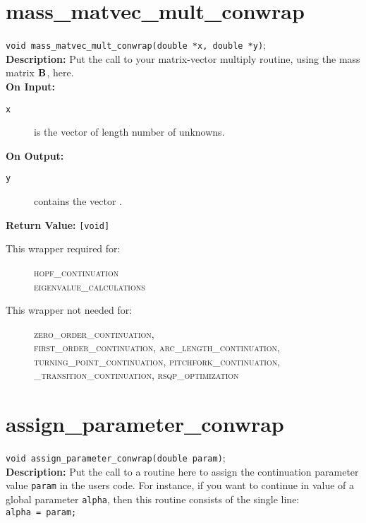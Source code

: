 \section{mass\_matvec\_mult\_conwrap}
\texttt{void mass\_matvec\_mult\_conwrap(double *x, double *y)}; \\

{\bf Description:}  Put the call to your matrix-vector multiply routine, using the mass matrix ${\bf B}$, here.\\

{\bf On Input:}
\begin{description}
\item[\texttt{x}] is the vector of length number of unknowns.
\end{description}

{\bf On Output:}
\begin{description}
\item[\texttt{y}] contains the vector \bfB \bfx .
\end{description}

{\bf Return Value:} \texttt{[void]}

\begin{description}
\item[This wrapper required for:]
\textsc{hopf\_continuation \\ eigenvalue\_calculations}
\item[This wrapper not needed for:]
\textsc{zero\_order\_continuation,\\
first\_order\_continuation, arc\_length\_continuation, \\ 
turning\_point\_continuation, pitchfork\_continuation, \\ 
\_transition\_continuation, rsqp\_optimization}
\end{description}

\section{assign\_parameter\_conwrap} \label{sec:apwrap}
\texttt{void assign\_parameter\_conwrap(double param)}; \\

{\bf Description:}  Put the call to a routine here to assign the continuation parameter value \texttt{param} in the users code. For instance, if you want to continue in value of a global parameter \texttt{alpha}, then this routine consists of the single line: \\
\hspace{0.7in} \texttt{alpha = param;} \\

